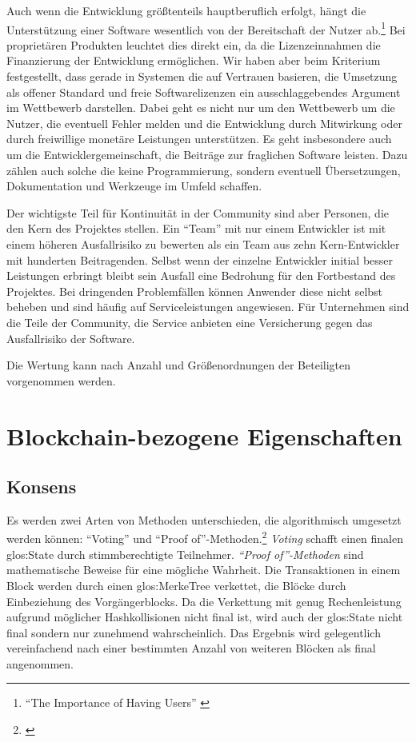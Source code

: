 Auch wenn die Entwicklung größtenteils hauptberuflich erfolgt, hängt die Unterstützung einer Software wesentlich von der Bereitschaft der Nutzer ab.\footnote{\enquote{The Importance of Having Users} \autocite{Raymond:CB}}
Bei proprietären Produkten leuchtet dies direkt ein, da die Lizenzeinnahmen die Finanzierung der Entwicklung ermöglichen.
Wir haben aber beim Kriterium  festgestellt, dass gerade in Systemen die auf Vertrauen basieren, die Umsetzung als offener Standard und freie Softwarelizenzen ein ausschlaggebendes Argument im Wettbewerb darstellen. 
Dabei geht es nicht nur um den Wettbewerb um die Nutzer, die eventuell Fehler melden und die Entwicklung durch Mitwirkung oder durch freiwillige monetäre Leistungen unterstützen. Es geht insbesondere auch um die Entwicklergemeinschaft, die Beiträge zur fraglichen Software leisten. Dazu zählen auch solche die keine Programmierung, sondern eventuell Übersetzungen, Dokumentation und Werkzeuge im Umfeld schaffen.

Der wichtigste Teil für Kontinuität in der Community sind aber Personen, die den Kern des Projektes stellen.
Ein \enquote{Team} mit nur einem Entwickler ist mit einem höheren Ausfallrisiko zu bewerten als ein Team aus zehn Kern-Entwickler mit hunderten Beitragenden.
Selbst wenn der einzelne Entwickler initial besser Leistungen erbringt bleibt sein Ausfall eine Bedrohung für den Fortbestand des Projektes.
Bei dringenden Problemfällen können Anwender diese nicht selbst beheben und sind häufig auf Serviceleistungen angewiesen.
Für Unternehmen sind die Teile der Community, die Service anbieten eine Versicherung gegen das Ausfallrisiko der Software. 

Die Wertung kann nach Anzahl und Größenordnungen der Beteiligten vorgenommen werden.


\section{Blockchain-bezogene Eigenschaften}\label{krit:blockchainproperties}

\subsection{Konsens}\label{krit:consensus}

Es werden zwei Arten von Methoden unterschieden, die algorithmisch umgesetzt werden können: \enquote{Voting} und \enquote{Proof of}-Methoden.\footnote{\cite{p:hyperledger:consensus}}
\emph{Voting} schafft einen finalen \gls{glos:State} durch stimmberechtigte Teilnehmer.
\emph{\enquote{Proof of}-Methoden} sind mathematische Beweise für eine mögliche Wahrheit.
Die Transaktionen in einem Block werden durch einen \gls{glos:MerkeTree} verkettet, die Blöcke durch Einbeziehung des Vorgängerblocks.
Da die Verkettung mit genug Rechenleistung aufgrund möglicher Hashkollisionen nicht final ist, wird auch der \gls{glos:State} nicht final sondern nur zunehmend wahrscheinlich.
Das Ergebnis wird gelegentlich vereinfachend nach einer bestimmten Anzahl von weiteren Blöcken als final angenommen.

